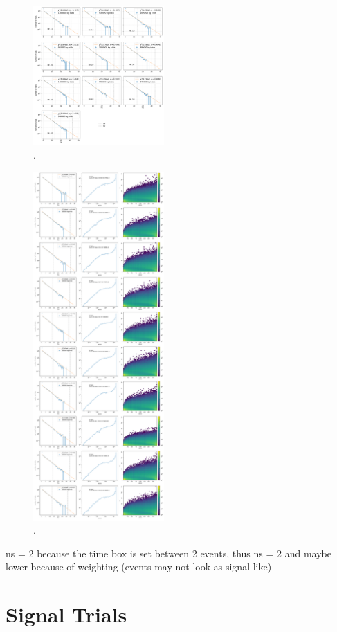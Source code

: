 \begin{figure}
    \centering
    \includegraphics[width=5cm]{Plots/05_csky/9_years_gfu_gold_time_dep_bg_t0.pdf}
    \caption{.}
\end{figure}

\begin{figure}
    \centering
    \includegraphics[width=5cm]{Plots/05_csky/9_years_gfu_gold_time_dep_bg_timewindows_fixed_t0.pdf}
    \caption{.}
\end{figure}

ns = 2 because the time box is set between 2 events, thus ns = 2 and maybe lower because of weighting (events may not look as signal like)
\section{Signal Trials}

